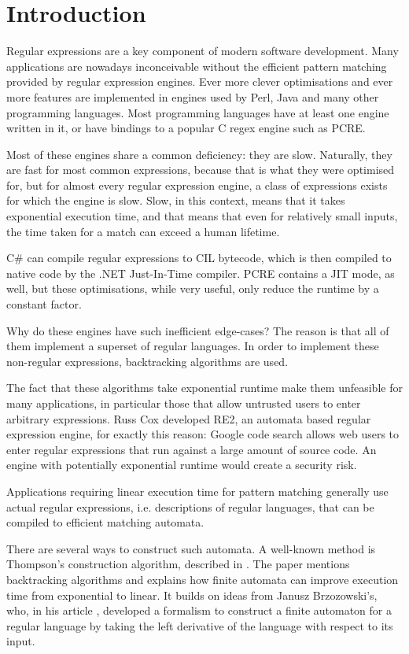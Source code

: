 \chapter{Introduction}

Regular expressions are a key component of modern software development. Many
applications are nowadays inconceivable without the efficient pattern matching
provided by regular expression engines. Ever more clever optimisations and ever
more features are implemented in engines used by Perl, Java and many other
programming languages. Most programming languages have at least one engine
written in it, or have bindings to a popular C regex engine such as PCRE.

Most of these engines share a common deficiency: they are slow. Naturally, they
are fast for most common expressions, because that is what they were optimised
for, but for almost every regular expression engine, a class of expressions
exists for which the engine is slow. Slow, in this context, means that it takes
exponential execution time, and that means that even for relatively small
inputs, the time taken for a match can exceed a human lifetime.

C\# can compile regular expressions to CIL bytecode, which is then compiled to
native code by the .NET Just-In-Time compiler. PCRE contains a JIT mode, as
well, but these optimisations, while very useful, only reduce the runtime by a
constant factor.

Why do these engines have such inefficient edge-cases? The reason is that all of
them implement a superset of regular languages. In order to implement these
non-regular expressions, backtracking algorithms are used.

The fact that these algorithms take exponential runtime make them unfeasible for
many applications, in particular those that allow untrusted users to enter
arbitrary expressions. Russ Cox developed RE2, an automata based regular
expression engine, for exactly this reason: Google code search allows web users
to enter regular expressions that run against a large amount of source code. An
engine with potentially exponential runtime would create a security risk.

Applications requiring linear execution time for pattern matching generally use
actual regular expressions, i.e. descriptions of regular languages, that can be
compiled to efficient matching automata.

There are several ways to construct such automata. A well-known method is
Thompson's construction algorithm, described in \cite{thompson}. The paper
mentions backtracking algorithms and explains how finite automata can improve
execution time from exponential to linear. It builds on ideas from Janusz
Brzozowski's, who, in his article \cite{brzozowski}, developed a formalism to
construct a finite automaton for a regular language by taking the left
derivative of the language with respect to its input.


